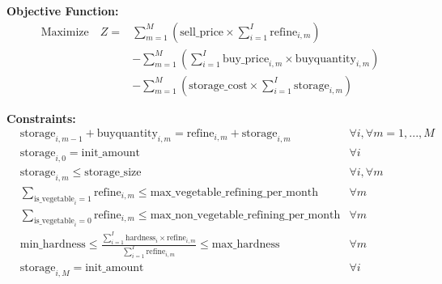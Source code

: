 \documentclass{article}
\begin{document}
\textbf{Objective Function:}
\begin{align*}
\text{Maximize} \quad Z = & \sum_{m=1}^{M} \left( \text{sell\_price} \times \sum_{i=1}^{I} \text{refine}_{i,m} \right) \\
& - \sum_{m=1}^{M} \left( \sum_{i=1}^{I} \text{buy\_price}_{i,m} \times \text{buyquantity}_{i,m} \right) \\
& - \sum_{m=1}^{M} \left( \text{storage\_cost} \times \sum_{i=1}^{I} \text{storage}_{i,m} \right)
\end{align*}

\textbf{Constraints:}
\begin{align*}
& \text{storage}_{i,m-1} + \text{buyquantity}_{i,m} = \text{refine}_{i,m} + \text{storage}_{i,m} & \forall i, \forall m=1,...,M \\
& \text{storage}_{i,0} = \text{init\_amount} & \forall i \\
& \text{storage}_{i,m} \leq \text{storage\_size} & \forall i, \forall m \\
& \sum_{\text{is\_vegetable}_i = 1} \text{refine}_{i,m} \leq \text{max\_vegetable\_refining\_per\_month} & \forall m \\
& \sum_{\text{is\_vegetable}_i = 0} \text{refine}_{i,m} \leq \text{max\_non\_vegetable\_refining\_per\_month} & \forall m \\
& \text{min\_hardness} \leq \frac{\sum_{i=1}^{I} \text{hardness}_{i} \times \text{refine}_{i,m}}{\sum_{i=1}^{I} \text{refine}_{i,m}} \leq \text{max\_hardness} & \forall m \\
& \text{storage}_{i,M} = \text{init\_amount} & \forall i
\end{align*}
\end{document}
